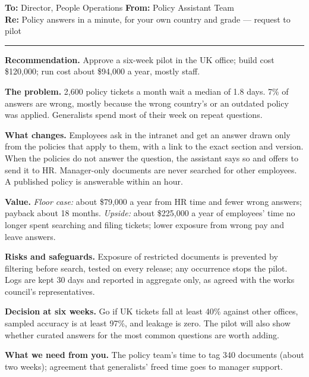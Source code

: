 \begin{tcolorbox}[colback=white, colframe=black!60, boxrule=0.6pt, arc=1pt, left=10pt, right=10pt, top=8pt, bottom=8pt, fontupper=\small]
\textbf{To:} Director, People Operations \hfill \textbf{From:} Policy Assistant Team\\
\textbf{Re:} Policy answers in a minute, for your own country and grade --- request to pilot

\smallskip\hrule\smallskip

\textbf{Recommendation.} Approve a six-week pilot in the UK office; build cost \$120{,}000; run cost about \$94{,}000 a year, mostly staff.

\textbf{The problem.} 2{,}600 policy tickets a month wait a median of 1.8 days. 7\% of answers are wrong, mostly because the wrong country's or an outdated policy was applied. Generalists spend most of their week on repeat questions.

\textbf{What changes.} Employees ask in the intranet and get an answer drawn only from the policies that apply to them, with a link to the exact section and version. When the policies do not answer the question, the assistant says so and offers to send it to HR. Manager-only documents are never searched for other employees. A published policy is answerable within an hour.

\textbf{Value.} \emph{Floor case:} about \$79{,}000 a year from HR time and fewer wrong answers; payback about 18 months. \emph{Upside:} about \$225{,}000 a year of employees' time no longer spent searching and filing tickets; lower exposure from wrong pay and leave answers.

\textbf{Risks and safeguards.} Exposure of restricted documents is prevented by filtering before search, tested on every release; any occurrence stops the pilot. Logs are kept 30 days and reported in aggregate only, as agreed with the works council's representatives.

\textbf{Decision at six weeks.} Go if UK tickets fall at least 40\% against other offices, sampled accuracy is at least 97\%, and leakage is zero. The pilot will also show whether curated answers for the most common questions are worth adding.

\textbf{What we need from you.} The policy team's time to tag 340 documents (about two weeks); agreement that generalists' freed time goes to manager support.
\end{tcolorbox}


